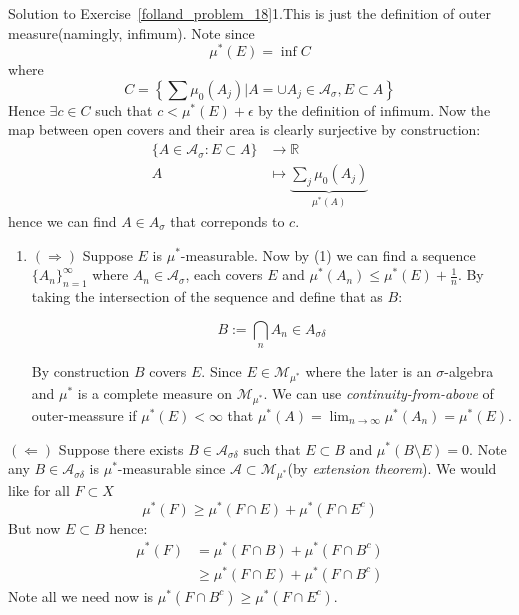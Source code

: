\begin{mystsolution}{Solution to Exercise~\ref{folland_problem_18}}1.This is just the definition of outer measure(namingly, infimum). Note since
\begin{equation}
\mu^*(E)= \inf C
\end{equation}
where
\begin{equation}
C= \left\{\sum \mu_0(A_j) | A=\cup A_j\in \mathcal A_{\sigma}, E\subset A \right\}
\end{equation}
Hence $\exists c\in C$ such that $c < \mu^*(E)+\epsilon$ by the definition of infimum. Now the map between open covers and their area is clearly surjective by construction:
\begin{equation}
\begin{aligned}
\{A\in \mathcal A_{\sigma} : E\subset A\} &\to \mathbb{R} \\
A &\mapsto \underbrace{\sum_j \mu_0(A_j)}_{\mu^*(A)}
\end{aligned}
\end{equation}
hence we can find $A\in A_{\sigma}$ that correponds to $c$.

\begin{enumerate}[resume]
\item $(\Longrightarrow)$ Suppose $E$ is $\mu^*$-measurable. Now by (1) we can find a sequence $\{A_n\}_{n=1}^{\infty}$ where $A_n\in \mathcal A_{\sigma}$, each covers $E$ and $\mu^*(A_n)\leq \mu^*(E)+\frac1n$.  By taking the intersection of the sequence and define that as $B$:

\begin{equation}
B:=\bigcap_{n}A_{n} \in A_{\sigma \delta}
\end{equation}


By construction $B$ covers $E$. Since $E\in \mathcal M_{\mu^*}$ where the later is an $\sigma$-algebra and $\mu^*$ is a complete measure on $\mathcal{M}_{\mu^*}$. We can use \textit{continuity-from-above} of outer-meassure if $\mu^*(E)<\infty$ that $\mu^*(A)=\lim_{n \to \infty}\mu^*(A_n)=\mu^*(E)$.
\end{enumerate}

$(\Longleftarrow)$ Suppose there exists $B\in \mathcal A_{\sigma \delta}$ such that $E\subset B$ and $\mu^*(B\setminus E)=0$. Note any $B\in \mathcal A_{\sigma \delta}$ is $\mu^*$-measurable since $\mathcal A \subset \mathcal M_{\mu^*}$(by \textit{extension theorem}).
We would like for all $F\subset X$
\begin{equation}
\mu^*(F) \geq  \mu^*(F\cap E) +\mu^*(F \cap E^c)
\end{equation}
But now $E\subset B$ hence:
\begin{equation}
\begin{aligned}
\mu^*(F) &= \mu^*(F\cap B) + \mu^*(F\cap B^c) \\ 
&\geq  \mu^*(F\cap E) + \mu^*(F\cap B^c)
\end{aligned}
\end{equation}
Note all we need now is $\mu^*(F \cap B^c) \geq  \mu^*(F\cap E^c)$.


\end{mystsolution}
